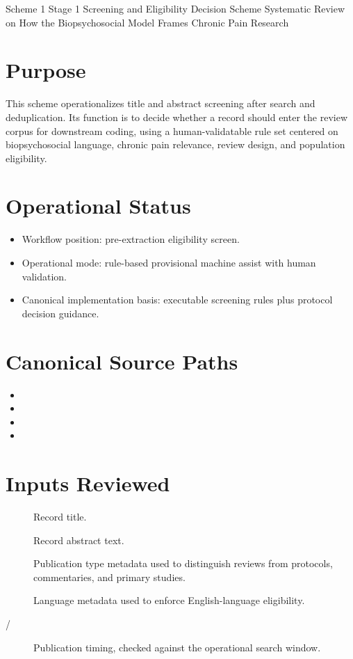 \documentclass[11pt]{article}
\begin{document}
\schemeheader
  {Scheme 1}
  {Stage 1 Screening and Eligibility Decision Scheme}
  {Systematic Review on How the Biopsychosocial Model Frames Chronic Pain Research}

\section*{Purpose}
This scheme operationalizes title and abstract screening after search and deduplication. Its function is to decide whether a record should enter the review corpus for downstream coding, using a human-validatable rule set centered on biopsychosocial language, chronic pain relevance, review design, and population eligibility.

\section*{Operational Status}
\begin{itemize}
\item Workflow position: pre-extraction eligibility screen.
\item Operational mode: rule-based provisional machine assist with human validation.
\item Canonical implementation basis: executable screening rules plus protocol decision guidance.
\end{itemize}

\section*{Canonical Source Paths}
\begin{itemize}
\item {}
\item {}
\item {}
\item {}
\end{itemize}

\section*{Inputs Reviewed}
\begin{description}
\item[] Record title.
\item[] Record abstract text.
\item[] Publication type metadata used to distinguish reviews from protocols, commentaries, and primary studies.
\item[] Language metadata used to enforce English-language eligibility.
\item[ / ] Publication timing, checked against the operational search window.
\end{description}
\end{document}
